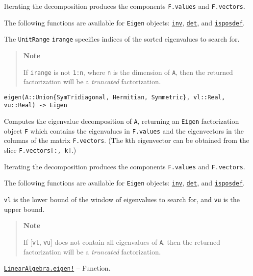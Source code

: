 \begin{adjustwidth}{2em}{0pt}
Iterating the decomposition produces the components \texttt{F.values} and \texttt{F.vectors}.

The following functions are available for \texttt{Eigen} objects: \hyperlink{13336866048543706848}{\texttt{inv}}, \hyperlink{16543378577000914469}{\texttt{det}}, and \hyperlink{13841568437070319804}{\texttt{isposdef}}.

The \texttt{UnitRange} \texttt{irange} specifies indices of the sorted eigenvalues to search for.

\begin{quote}
\textbf{Note}

If \texttt{irange} is not \texttt{1:n}, where \texttt{n} is the dimension of \texttt{A}, then the returned factorization will be a \emph{truncated} factorization.

\end{quote}



\begin{lstlisting}
eigen(A::Union{SymTridiagonal, Hermitian, Symmetric}, vl::Real, vu::Real) -> Eigen
\end{lstlisting}

Computes the eigenvalue decomposition of \texttt{A}, returning an \texttt{Eigen} factorization object \texttt{F} which contains the eigenvalues in \texttt{F.values} and the eigenvectors in the columns of the matrix \texttt{F.vectors}. (The \texttt{k}th eigenvector can be obtained from the slice \texttt{F.vectors[:, k]}.)

Iterating the decomposition produces the components \texttt{F.values} and \texttt{F.vectors}.

The following functions are available for \texttt{Eigen} objects: \hyperlink{13336866048543706848}{\texttt{inv}}, \hyperlink{16543378577000914469}{\texttt{det}}, and \hyperlink{13841568437070319804}{\texttt{isposdef}}.

\texttt{vl} is the lower bound of the window of eigenvalues to search for, and \texttt{vu} is the upper bound.

\begin{quote}
\textbf{Note}

If [\texttt{vl}, \texttt{vu}] does not contain all eigenvalues of \texttt{A}, then the returned factorization will be a \emph{truncated} factorization.

\end{quote}


\end{adjustwidth}
\hypertarget{11207008815152064958}{} 
\hyperlink{11207008815152064958}{\texttt{LinearAlgebra.eigen!}}  -- {Function.}

